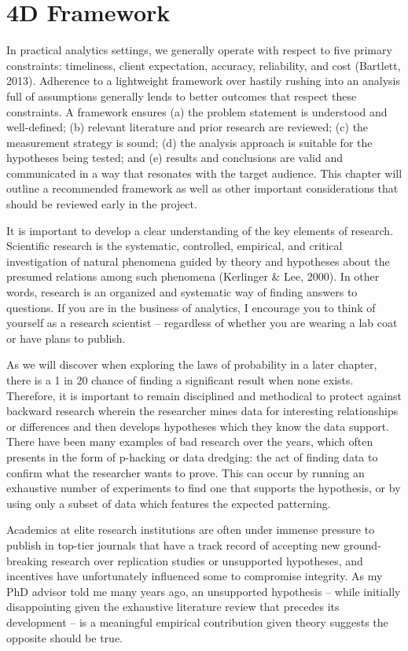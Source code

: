 \documentclass[
]{book}
\begin{document}
\hypertarget{d-framework}{%
\section{4D Framework}\label{d-framework}}

In practical analytics settings, we generally operate with respect to five primary constraints: timeliness, client expectation, accuracy, reliability, and cost (Bartlett, 2013). Adherence to a lightweight framework over hastily rushing into an analysis full of assumptions generally lends to better outcomes that respect these constraints. A framework ensures (a) the problem statement is understood and well-defined; (b) relevant literature and prior research are reviewed; (c) the measurement strategy is sound; (d) the analysis approach is suitable for the hypotheses being tested; and (e) results and conclusions are valid and communicated in a way that resonates with the target audience. This chapter will outline a recommended framework as well as other important considerations that should be reviewed early in the project.

It is important to develop a clear understanding of the key elements of research. Scientific research is the systematic, controlled, empirical, and critical investigation of natural phenomena guided by theory and hypotheses about the presumed relations among such phenomena (Kerlinger \& Lee, 2000). In other words, research is an organized and systematic way of finding answers to questions. If you are in the business of analytics, I encourage you to think of yourself as a research scientist -- regardless of whether you are wearing a lab coat or have plans to publish.

As we will discover when exploring the laws of probability in a later chapter, there is a 1 in 20 chance of finding a significant result when none exists. Therefore, it is important to remain disciplined and methodical to protect against backward research wherein the researcher mines data for interesting relationships or differences and then develops hypotheses which they know the data support. There have been many examples of bad research over the years, which often presents in the form of p-hacking or data dredging: the act of finding data to confirm what the researcher wants to prove. This can occur by running an exhaustive number of experiments to find one that supports the hypothesis, or by using only a subset of data which features the expected patterning.

Academics at elite research institutions are often under immense pressure to publish in top-tier journals that have a track record of accepting new ground-breaking research over replication studies or unsupported hypotheses, and incentives have unfortunately influenced some to compromise integrity. As my PhD advisor told me many years ago, an unsupported hypothesis -- while initially disappointing given the exhaustive literature review that precedes its development -- is a meaningful empirical contribution given theory suggests the opposite should be true.
\end{document}
